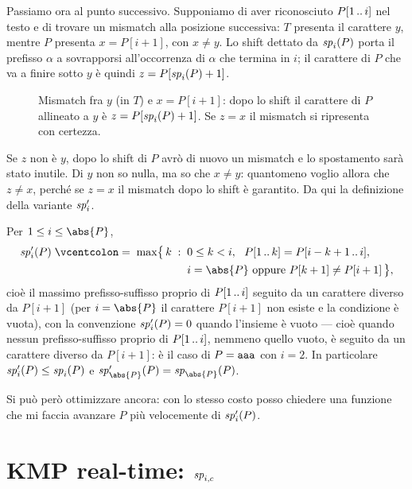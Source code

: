 Passiamo ora al punto successivo. Supponiamo di aver riconosciuto $P[1\,..\,i]$
nel testo e di trovare un mismatch alla posizione successiva: $T$ presenta il
carattere $y$, mentre $P$ presenta $x=P[i+1]$, con $x\ne y$. Lo shift dettato da
$\mathit{sp}_{i}(P)$ porta il prefisso $\alpha$ a sovrapporsi all'occorrenza di $\alpha$
che termina in $i$; il carattere di $P$ che va a finire sotto $y$ è quindi
$z=P[\mathit{sp}_{i}(P)+1]$.

\begin{figure}[H]
  \centering
  
  \caption{Mismatch fra $y$ (in $T$) e $x=P[i+1]$: dopo lo shift il carattere di
  $P$ allineato a $y$ è $z=P[\mathit{sp}_{i}(P)+1]$. Se $z=x$ il mismatch si ripresenta
  con certezza.}
  \label{fig:kmp-sp-primo}
\end{figure}

Se $z$ non è $y$, dopo lo shift di $P$ avrò di nuovo un mismatch e lo spostamento
sarà stato inutile. Di $y$ non so nulla, ma so che $x\ne y$: quantomeno voglio
allora che $z\ne x$, perché se $z=x$ il mismatch dopo lo shift è garantito. Da
qui la definizione della variante $\mathit{sp}'_{i}$.

\begin{definizione}[$\spp{i}(P)$]\label{def:sp-primo}
  Per $1\le i\le\abs{P}$,
  \begin{align*}
    \spp{i}(P)\;\defeq\;\max\bigl\{\,k \;:\;{} & 0\le k<i,\ \ \pre{P}{k}=\sub{P}{i-k+1}{i},\\
    & i=\abs{P}\ \text{oppure}\ P[k+1]\ne P[i+1] \,\bigr\} ,
  \end{align*}
  cioè il massimo prefisso-suffisso proprio di $P[1\,..\,i]$ seguito da un
  carattere diverso da $P[i+1]$ (per $i=\abs{P}$ il carattere $P[i+1]$ non esiste
  e la condizione è vuota), con la convenzione $\mathit{sp}'_{i}(P)=0$ quando l'insieme è
  vuoto --- cioè quando nessun prefisso-suffisso proprio di $P[1\,..\,i]$, nemmeno
  quello vuoto, è seguito da un carattere diverso da $P[i+1]$: è il caso di
  $P=\texttt{aaa}$ con $i=2$. In particolare $\mathit{sp}'_{i}(P)\le\mathit{sp}_{i}(P)$ e
  $\spp{\abs{P}}(P)=\spv{\abs{P}}(P)$.
\end{definizione}

Si può però ottimizzare ancora: con lo stesso costo posso chiedere una funzione
che mi faccia avanzare $P$ più velocemente di $\spp{i}(P)$.

\section{KMP real-time: \texorpdfstring{$\mathit{sp}_{i,c}$}{sp\_\{i,c\}}}
\label{sec:kmp-real-time}

